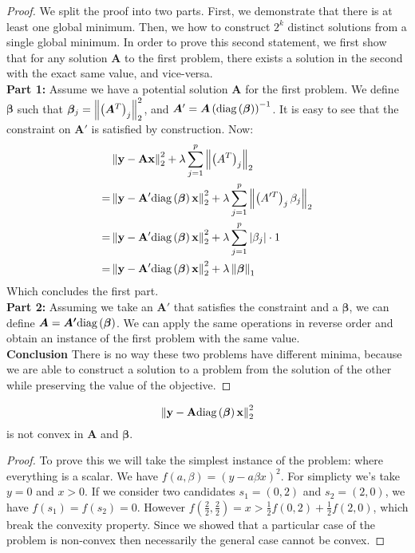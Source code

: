 \begin{proof}
  We split the proof into two parts. First, we
  demonstrate that there is at least one global minimum. Then, we 
    how to construct $2^k$ distinct solutions from a single global
  minimum.
  In order to prove this second statement, we first show that for any solution $\bm{A}$ to the first problem, there exists a solution in the second with the exact same value, and vice-versa.
  \\ \textbf{Part 1:} Assume we have a potential solution $\bm{A}$ for the first problem.  We define $\bm{\beta}$ such that $\bm{\beta}_j = \left\lVert\left(\bm{A}^T\right)_j\right\rVert_2^2$, and $\bm{A}' = \bm{A}\left(\text{diag}\left(\bm{\beta}\right)\right)^{-1}$. It is easy to see that the constraint on $\bm{A}'$ is satisfied by construction. Now:
  \begin{align*}
    & \left\lVert\bf{y} - \bf{A}\bf{x}\right\rVert_2^2 + \lambda \sum_{j=1}^p \left\lVert\left(A^T\right)_j\right\rVert_2 \\
    = &\left\lVert\bf{y} - \bf{A'}\text{diag}\left(\bm{\beta}\right)\bf{x}\right\rVert_2^2 + \lambda \sum_{j=1}^p \left\lVert\left(A'^T\right)_j\beta_j\right\rVert_2 \\
    = &\left\lVert\bf{y} - \bf{A'}\text{diag}\left(\bm{\beta}\right)\bf{x}\right\rVert_2^2 + \lambda \sum_{j=1}^p \left|\beta_j\right| \cdot 1\\
    = &\left\lVert\bf{y} - \bf{A'}\text{diag}\left(\bm{\beta}\right)\bf{x}\right\rVert_2^2 + \lambda \left\lVert\bm{\beta}\right\rVert_1
  \end{align*}
  Which concludes the first part.
  \\ \textbf{Part 2:} Assuming we take an $\bm{A}'$ that satisfies the constraint and a $\bm{\beta}$, we can define $\bm{A} = \bm{A'}\text{diag}\left(\bm{\beta}\right)$. We can apply the same operations in reverse order and obtain an instance of the first problem with the same value.
  \\ \textbf{Conclusion} There is no way these two problems have different minima,
  because we are able to construct a solution to a problem from the solution
  of the other while preserving the value of the objective.
\end{proof}

\begin{proposition}
\label{unconstrained_non_convex}
\begin{equation*}
     \left\lVert\bf{y} - \bf{A}\text{diag}\left(\bm{\beta}\right)\bf{x}\right\rVert_2^2
\end{equation*}
is not convex in $\bm{A}$ and $\bm{\beta}$.
\begin{proof}
  To prove this we will take the simplest instance of the problem: where everything is a scalar. We have $f(a, \beta) = \left(y - a\beta x\right)^2$. For simplicty we's take $y = 0$ and $x > 0$. If we consider two candidates $s_1 = (0, 2)$ and $s_2 = (2, 0)$, we have $f(s_1) = f(s_2) = 0$. However $f(\frac{2}{2}, \frac{2}{2}) = x > \frac{1}{2} f(0, 2) + \frac{1}{2}f(2, 0)$, which break the convexity property. Since we showed that a particular case of the problem is non-convex then necessarily the general case cannot be convex.
\end{proof}
\end{proposition}

